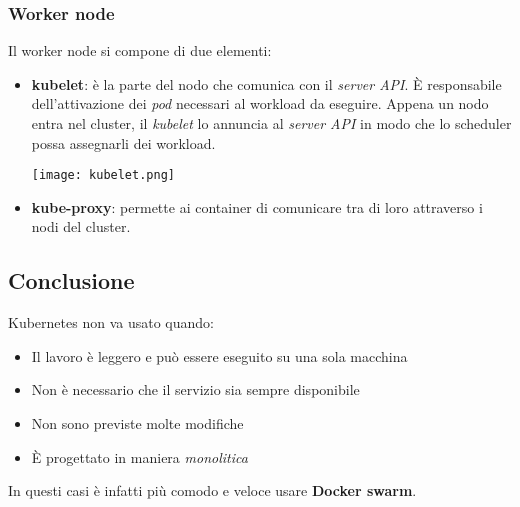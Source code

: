 \subsubsection{Worker node}
Il worker node si compone di due elementi:
\begin{itemize}
	\item \textbf{kubelet}: è la parte del nodo che comunica con il \textit{server API}. È responsabile dell'attivazione dei \textit{pod} necessari al workload da eseguire. Appena un nodo entra nel cluster, il \textit{kubelet} lo annuncia al \textit{server API} in modo che lo scheduler possa assegnarli dei workload.
	\begin{center}
		\texttt{[image: kubelet.png]}
	\end{center}
	\item \textbf{kube-proxy}: permette ai container di comunicare tra di loro attraverso i nodi del cluster.
\end{itemize}

\subsection{Conclusione}
Kubernetes non va usato quando:
\begin{itemize}
	\item Il lavoro è leggero e può essere eseguito su una sola macchina
	\item Non è necessario che il servizio sia sempre disponibile
	\item Non sono previste molte modifiche
	\item È progettato in maniera \textit{monolitica}
\end{itemize}
In questi casi è infatti più comodo e veloce usare \textbf{Docker swarm}.